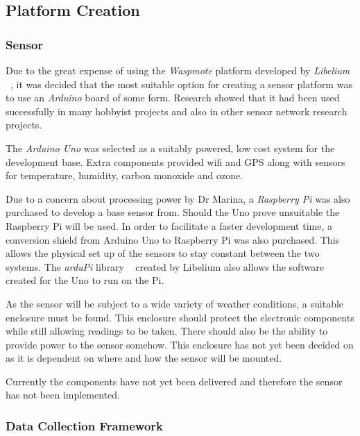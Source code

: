 \subsection{Platform Creation}\label{platformcreation}

\subsubsection{Sensor}\label{sensor}

Due to the great expense of using the \emph{Waspmote} platform developed by \emph{Libelium} ~\cite{waspmote}, it was decided that the most suitable option for creating a sensor platform was to use an \emph{Arduino} board of some form. Research showed that it had been used successfully in many hobbyist projects and also in other sensor network research projects. ~\cite{arduinoproj1}~\cite{arduinoproj2}~\cite{arduinoproj3} 

The \emph{Arduino Uno} was selected as a suitably powered, low cost system for the development base. Extra components provided wifi and GPS along with sensors for temperature, humidity, carbon monoxide and ozone. 

Due to a concern about processing power by Dr Marina, a \emph{Raspberry Pi} was also purchased to develop a base sensor from. Should the Uno prove unsuitable the Raspberry Pi will be used. In order to facilitate a faster development time, a conversion shield from Arduino Uno to Raspberry Pi was also purchased. This allows the physical set up of the sensors to stay constant between the two systems. The \emph{arduPi} library ~\cite{ardupi} created by Libelium also allows the software created for the Uno to run on the Pi. 

As the sensor will be subject to a wide variety of weather conditions, a suitable enclosure must be found. This enclosure should protect the electronic components while still allowing readings to be taken. There should also be the ability to provide power to the sensor somehow. This enclosure has not yet been decided on as it is dependent on where and how the sensor will be mounted. 

Currently the components have not yet been delivered and therefore the sensor has not been implemented. 

\subsubsection{Data Collection Framework}\label{datacollectionframework}

